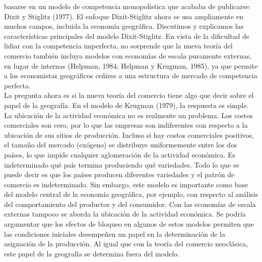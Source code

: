 basarse en un modelo de competencia monopolística que acababa de publicarse: Dixit y Stiglitz (1977). El enfoque Dixit-Stiglitz ahora se usa ampliamente en muchos campos, incluida la economía geográfica. Discutimos y explicamos las características principales del modelo Dixit-Stiglitz. En vista de la dificultad de lidiar con la competencia imperfecta, no sorprende que la nueva teoría del comercio también incluya modelos con economías de escala puramente externas, en lugar de internas (Helpman, 1984; Helpman y Krugman, 1985), ya que permite a los economistas geográficos ceñirse a una estructura de mercado de competencia perfecta.  \\
La pregunta ahora es si la nueva teoría del comercio tiene algo que decir sobre el papel de la geografía. En el modelo de Krugman (1979), la respuesta es simple. La ubicación de la actividad económica no es realmente un problema. Los costos comerciales son cero, por lo que las empresas son indiferentes con respecto a la ubicación de sus sitios de producción. Incluso si hay costos comerciales positivos, el tamaño del mercado (exógeno) se distribuye uniformemente entre los dos países, lo que impide cualquier aglomeración de la actividad económica. Es indeterminado qué país termina produciendo qué variedades. Todo lo que se puede decir es que los países producen diferentes variedades y el patrón de comercio es indeterminado. Sin embargo, este modelo es importante como base del modelo central de la economía geográfica, por ejemplo, con respecto al análisis del comportamiento del productor y del consumidor. Con las economías de escala externas tampoco se aborda la ubicación de la actividad económica. Se podría argumentar que los efectos de bloqueo en algunos de estos modelos permiten que las condiciones iniciales desempeñen un papel en la determinación de la asignación de la producción. Al igual que con la teoría del comercio neoclásica, este papel de la geografía se determina fuera del modelo.

